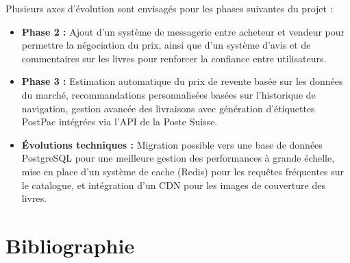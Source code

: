 \documentclass[12pt, a4paper]{report}
\renewcommand{\_}{\origunderscore\allowbreak}
\begin{document}
Plusieurs axes d'évolution sont envisagés pour les phases suivantes du projet :
\begin{itemize}
    \item \textbf{Phase 2 :} Ajout d'un système de messagerie entre acheteur et vendeur pour permettre la négociation du prix, ainsi que d'un système d'avis et de commentaires sur les livres pour renforcer la confiance entre utilisateurs.
    \item \textbf{Phase 3 :} Estimation automatique du prix de revente basée sur les données du marché, recommandations personnalisées basées sur l'historique de navigation, gestion avancée des livraisons avec génération d'étiquettes PostPac intégrées via l'API de la Poste Suisse.
    \item \textbf{Évolutions techniques :} Migration possible vers une base de données PostgreSQL pour une meilleure gestion des performances à grande échelle, mise en place d'un système de cache (Redis) pour les requêtes fréquentes sur le catalogue, et intégration d'un CDN pour les images de couverture des livres.
\end{itemize}

\chapter*{Bibliographie}
\end{document}

